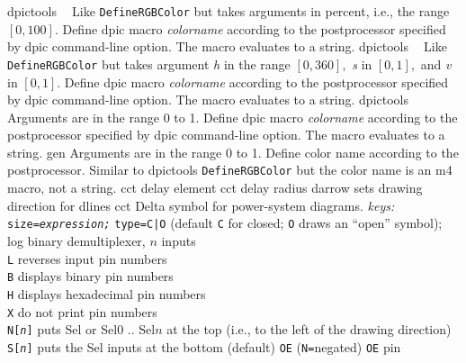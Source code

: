 %
  {dpictools}%
  {$\;\;$ Like {\tt DefineRGBColor} but takes arguments in percent, i.e.,
    the range $[0,100].$ Define dpic macro {\sl colorname}%
    according to the postprocessor specified by dpic command-line option.
    The macro evaluates to a string.}%
%
  {dpictools}%
  {$\;\;$ Like {\tt DefineRGBColor} but takes argument {\sl h} in the
    range $[0,360],$ {\sl s} in $[0,1],$ and {\sl v} in $[0,1].$
    Define dpic macro {\sl colorname}%
    according to the postprocessor specified by dpic command-line option.
    The macro evaluates to a string.}%
%
  {dpictools}%
  {$\;\;$ Arguments are in the range 0 to 1. Define dpic macro {\sl colorname}%
    according to the postprocessor specified by dpic command-line option.
    The macro evaluates to a string.}%
%
  {gen}%
  {Arguments are in the range 0 to 1. Define color name
    according to the postprocessor.  Similar to dpictools {\tt DefineRGBColor}%
    but the color name is an m4 macro, not a string.}%
%
  {cct}%
  {delay element}%
%
  {cct}%
  {delay radius}%
%
  {darrow}%
  {sets drawing direction for dlines}%
%
  {cct}%
  {Delta symbol for power-system diagrams.
   {\sl keys:} {\tt size={\sl expression;}}%
    {\tt type=C|O} (default {\tt C} for closed;
      {\tt O} draws an ``open'' symbol); }%
%
  {log}%
  {binary demultiplexer, $n$ inputs\\
    {\tt L} reverses input pin numbers\\
    {\tt B} displays binary pin numbers\\
    {\tt H} displays hexadecimal pin numbers\\
    {\tt X} do not print pin numbers\\
    {\tt N[{\sl n}]} puts Sel or Sel$0$ .. Sel$n$ at the top
    (i.e., to the left of the drawing direction)\\
    {\tt S[{\sl n}]} puts the Sel inputs at the bottom (default)
    {\tt OE} ({\tt N=}negated) {\tt OE} pin
    }%
